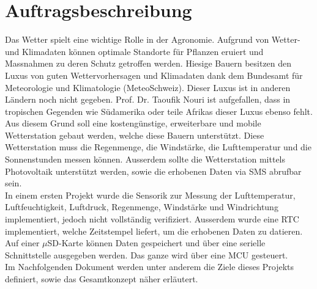 \cleardoublepage
\thispagestyle{empty}
\section*{Auftragsbeschreibung}
Das Wetter spielt eine wichtige Rolle in der Agronomie. Aufgrund von Wetter- und Klimadaten können optimale Standorte für Pflanzen eruiert und Massnahmen zu deren Schutz getroffen werden. Hiesige Bauern besitzen den Luxus von guten Wettervorhersagen und Klimadaten dank dem Bundesamt für Meteorologie und Klimatologie (MeteoSchweiz). Dieser Luxus ist in anderen Ländern noch nicht gegeben. Prof. Dr. Taoufik Nouri ist aufgefallen, dass in tropischen Gegenden wie Südamerika oder teile Afrikas dieser Luxus ebenso fehlt. \\

Aus diesem Grund soll eine kostengünstige, erweiterbare und mobile Wetterstation gebaut werden, welche diese Bauern unterstützt. Diese Wetterstation muss die Regenmenge, die Windstärke, die Lufttemperatur und die Sonnenstunden messen können. Ausserdem sollte die Wetterstation mittels Photovoltaik unterstützt werden, sowie die erhobenen Daten via SMS abrufbar sein. \\

In einem ersten Projekt wurde die Sensorik zur Messung der Lufttemperatur, Luftfeuchtigkeit, Luftdruck, Regenmenge, Windstärke und Windrichtung implementiert, jedoch nicht vollständig verifiziert. Ausserdem wurde eine RTC implementiert, welche Zeitstempel liefert, um die erhobenen Daten zu datieren. Auf einer $\mu$SD-Karte können Daten gespeichert und über eine serielle Schnittstelle ausgegeben werden. Das ganze wird über eine MCU gesteuert. \\

Im Nachfolgenden Dokument werden unter anderem die Ziele dieses Projekts definiert, sowie das Gesamtkonzept näher erläutert. 